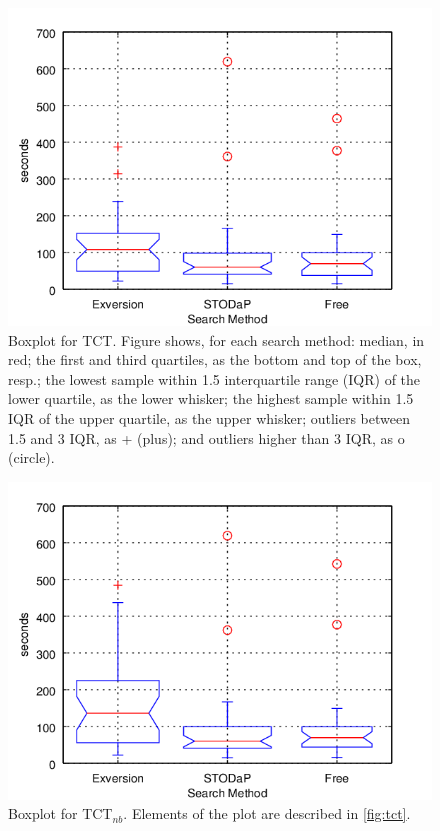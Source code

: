 \begin{figure}[t]
\begin{center}
\includegraphics[scale=1.2]{images/tct_boxplotresults.png}
\caption[Boxplot for TCT.]{Boxplot for TCT. Figure shows, for each search method: median, in red; the first and third quartiles, as the bottom and top of the box, resp.; the lowest sample within 1.5 interquartile range (IQR) of the lower quartile, as the lower whisker; the highest sample within 1.5 IQR of the upper quartile, as the upper whisker; outliers between 1.5 and 3 IQR, as + (plus); and outliers higher than 3 IQR, as o (circle).}
\label{fig:tct}
\end{center}
\end{figure}

\begin{figure}[h]
\begin{center}
\includegraphics[scale=1.2]{images/tct_boxplotresults_notnull.png}
\caption[Boxplot for TCT$_{nb}$.]{Boxplot for TCT$_{nb}$. Elements of the plot are described in \autoref{fig:tct}.}
\label{fig:tct_nb}
\end{center}
\end{figure}

